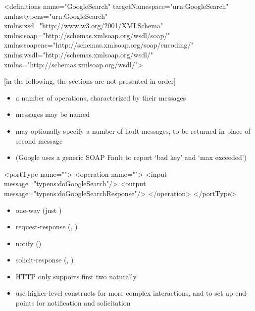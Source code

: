 \documentclass{sepslide-soa-faked} %
\begin{document}
\begin{slide}
\begin{xml}
<definitions 
  name="GoogleSearch"
  targetNamespace="urn:GoogleSearch"
  xmlns:typens="urn:GoogleSearch"
  xmlns:xsd="http://www.w3.org/2001/XMLSchema"
  xmlns:soap="http://schemas.xmlsoap.org/wsdl/soap/"
  xmlns:soapenc="http://schemas.xmlsoap.org/soap/encoding/"
  xmlns:wsdl="http://schemas.xmlsoap.org/wsdl/"
  xmlns="http://schemas.xmlsoap.org/wsdl/">
\end{xml}
[in the following, the sections are not presented in order]
\end{slide}

\begin{slide}
	\begin{itemize}
	\item a number of operations, characterized by their messages
	\item messages may be named
	\item may optionally specify a number of fault messages, to be 
		returned in place of second message
	\item (Google uses a generic SOAP Fault to report `bad key' 
		and `max exceeded')
	\end{itemize}
\bigskip

\begin{xml}
<portType name="">
  <operation name="">
    <input message="typens:doGoogleSearch"/>
    <output message="typens:doGoogleSearchResponse"/>
  </operation>
</portType>
\end{xml}
\end{slide}

\begin{slide}

	\begin{itemize}
	\item one-way  (just )
	\item request-response (, )
	\item notify ()
	\item solicit-response (, )
	\item HTTP only supports first two naturally
	\item use higher-level constructs for more complex interactions,
		and to set up end-points for notification and solicitation
	\end{itemize}
\end{slide}
\end{document}
